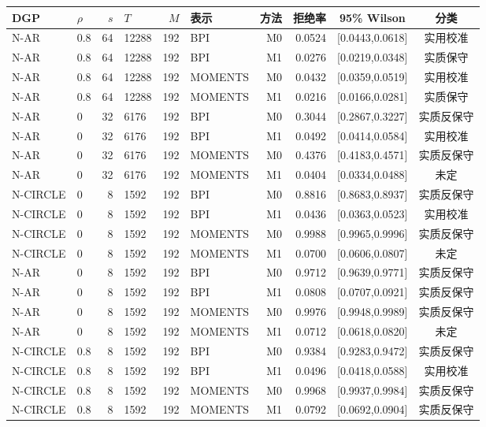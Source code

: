 \documentclass[UTF8,zihao=-4]{ctexart}
\theoremstyle{remark}
\begin{document}
\begin{longtable}{llrlrlrrc c}
\toprule
DGP & $\rho$ & $s$ & $T$ & $M$ & 表示 & 方法 & 拒绝率 & 95\% Wilson & 分类\\
\midrule
\endhead
N-AR & 0.8 & 64 & 12288 & 192 & BPI & M0 & 0.0524 & [0.0443,0.0618] & 实用校准\\
N-AR & 0.8 & 64 & 12288 & 192 & BPI & M1 & 0.0276 & [0.0219,0.0348] & 实质保守\\
N-AR & 0.8 & 64 & 12288 & 192 & MOMENTS & M0 & 0.0432 & [0.0359,0.0519] & 实用校准\\
N-AR & 0.8 & 64 & 12288 & 192 & MOMENTS & M1 & 0.0216 & [0.0166,0.0281] & 实质保守\\
N-AR & 0 & 32 & 6176 & 192 & BPI & M0 & 0.3044 & [0.2867,0.3227] & 实质反保守\\
N-AR & 0 & 32 & 6176 & 192 & BPI & M1 & 0.0492 & [0.0414,0.0584] & 实用校准\\
N-AR & 0 & 32 & 6176 & 192 & MOMENTS & M0 & 0.4376 & [0.4183,0.4571] & 实质反保守\\
N-AR & 0 & 32 & 6176 & 192 & MOMENTS & M1 & 0.0404 & [0.0334,0.0488] & 未定\\
N-CIRCLE & 0 & 8 & 1592 & 192 & BPI & M0 & 0.8816 & [0.8683,0.8937] & 实质反保守\\
N-CIRCLE & 0 & 8 & 1592 & 192 & BPI & M1 & 0.0436 & [0.0363,0.0523] & 实用校准\\
N-CIRCLE & 0 & 8 & 1592 & 192 & MOMENTS & M0 & 0.9988 & [0.9965,0.9996] & 实质反保守\\
N-CIRCLE & 0 & 8 & 1592 & 192 & MOMENTS & M1 & 0.0700 & [0.0606,0.0807] & 未定\\
N-AR & 0 & 8 & 1592 & 192 & BPI & M0 & 0.9712 & [0.9639,0.9771] & 实质反保守\\
N-AR & 0 & 8 & 1592 & 192 & BPI & M1 & 0.0808 & [0.0707,0.0921] & 实质反保守\\
N-AR & 0 & 8 & 1592 & 192 & MOMENTS & M0 & 0.9976 & [0.9948,0.9989] & 实质反保守\\
N-AR & 0 & 8 & 1592 & 192 & MOMENTS & M1 & 0.0712 & [0.0618,0.0820] & 未定\\
N-CIRCLE & 0.8 & 8 & 1592 & 192 & BPI & M0 & 0.9384 & [0.9283,0.9472] & 实质反保守\\
N-CIRCLE & 0.8 & 8 & 1592 & 192 & BPI & M1 & 0.0496 & [0.0418,0.0588] & 实用校准\\
N-CIRCLE & 0.8 & 8 & 1592 & 192 & MOMENTS & M0 & 0.9968 & [0.9937,0.9984] & 实质反保守\\
N-CIRCLE & 0.8 & 8 & 1592 & 192 & MOMENTS & M1 & 0.0792 & [0.0692,0.0904] & 实质反保守\\

\end{longtable}
\end{document}
